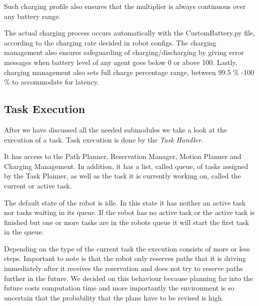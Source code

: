 \documentclass[journal]{IEEEtran}
\begin{document}
Such charging profile also ensures that the multiplier is always continuous over any battery range.

The actual charging process occurs automatically with the CustomBattery.py file, according to the charging rate decided in robot configs. The charging management also ensures safeguarding of charging/discharging by giving error messages when battery level of any agent goes below 0 or above 100. Lastly, charging management also  sets full charge percentage range, between 99.5 \% -100 \% to accommodate for latency. 


\subsection{Task Execution}
\label{subsec:task_execution}
After we have discussed all the needed submodules we take a look at the execution of a task. Task execution is done by the \textit{Task Handler}.

It has access to the Path Planner, Reservation Manager, Motion Planner and Charging Management. In addition, it has a list, called queue, of tasks assigned by the Task Planner, as well as the task it is currently working on, called the current or active task.

The default state of the robot is idle. In this state it has neither an active task nor tasks waiting in its queue. If the robot has no active task or the active task is finished but one or more tasks are in the robots queue it will start the first task in the queue.

Depending on the type of the current task the execution consists of more or less steps. Important to note is that the robot only reserves paths that it is driving immediately after it receives the reservation and does not try to reserve paths further in the future. We decided on this behaviour because planning far into the future costs computation time and more importantly the environment is so uncertain that the probability that the plans have to be revised is high.
\end{document}
